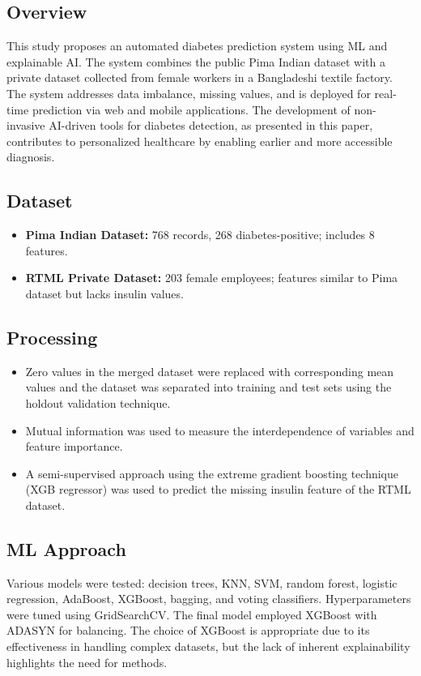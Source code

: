 \subsection*{Overview}
This study proposes an automated diabetes prediction system using ML and explainable AI. The system combines the public Pima Indian dataset with a private dataset collected from female workers in a Bangladeshi textile factory. The system addresses data imbalance, missing values, and is deployed for real-time prediction via web and mobile applications. The development of non-invasive AI-driven tools for diabetes detection, as presented in this paper, contributes to personalized healthcare by enabling earlier and more accessible diagnosis.

\subsection*{Dataset}
\begin{itemize}
    \item \textbf{Pima Indian Dataset:} 768 records, 268 diabetes-positive; includes 8 features.
    \item \textbf{RTML Private Dataset:} 203 female employees; features similar to Pima dataset but lacks insulin values.
\end{itemize}

\subsection*{Processing}
\begin{itemize}
    \item Zero values in the merged dataset were replaced with corresponding mean values and the dataset was separated into training and test sets using the holdout validation technique.
    \item Mutual information was used to measure the interdependence of variables and feature importance.
    \item A semi-supervised approach using the extreme gradient boosting technique (XGB regressor) was used to predict the missing insulin feature of the RTML dataset.
\end{itemize}

\subsection*{ML Approach}
Various models were tested: decision trees, KNN, SVM, random forest, logistic regression, AdaBoost, XGBoost, bagging, and voting classifiers. Hyperparameters were tuned using GridSearchCV. The final model employed XGBoost with ADASYN for balancing. The choice of XGBoost is appropriate due to its effectiveness in handling complex datasets, but the lack of inherent explainability highlights the need for methods.

